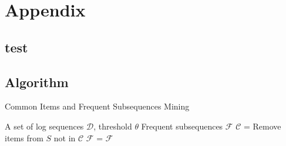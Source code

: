 \section{Appendix}

\subsection{test}

\subsection{Algorithm}
\begin{algorithm}
\caption{Common Items and Frequent Subsequences Mining}
\label{alg:fre-common}
\begin{algorithmic}[1]
\Require A set of log sequences \( \mathcal{D} \), threshold \( \theta \)
\Ensure Frequent subsequences \( \mathcal{F} \)
\Statex
{}
    \State \( \mathcal{C} \) = 
        \State Remove items from \(S\) not in \( \mathcal{C} \)
    \EndFor
    \State \( \mathcal{F} \) = 
    \State \Return \( \mathcal{F} \)
\EndFunction
\Statex
\end{algorithmic}
\end{algorithm}

